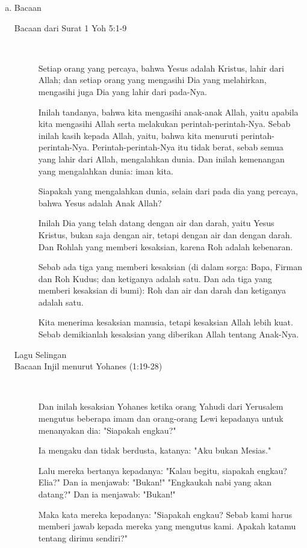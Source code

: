 \documentclass[a5paper,titlepage,12pt]{scrbook}
\begin{document}
\begin{itemize}
\begin{enumerate}[a.]
		\item Bacaan
			\begin{description}
				\item [Bacaan dari Surat 1 Yoh 5:1-9] 
					{~}

Setiap orang yang percaya, bahwa Yesus adalah Kristus, lahir dari Allah; dan setiap orang yang mengasihi Dia yang melahirkan, mengasihi juga Dia yang lahir dari pada-Nya.

Inilah tandanya, bahwa kita mengasihi anak-anak Allah, yaitu apabila kita mengasihi Allah serta melakukan perintah-perintah-Nya.
Sebab inilah kasih kepada Allah, yaitu, bahwa kita menuruti perintah-perintah-Nya. Perintah-perintah-Nya itu tidak berat,
sebab semua yang lahir dari Allah, mengalahkan dunia. Dan inilah kemenangan yang mengalahkan dunia: iman kita.

Siapakah yang mengalahkan dunia, selain dari pada dia yang percaya, bahwa Yesus adalah Anak Allah?

Inilah Dia yang telah datang dengan air dan darah, yaitu Yesus Kristus, bukan saja dengan air, tetapi dengan air dan dengan darah. Dan Rohlah yang memberi kesaksian, karena Roh adalah kebenaran.

Sebab ada tiga yang memberi kesaksian (di dalam sorga: Bapa, Firman dan Roh Kudus; dan ketiganya adalah satu.
Dan ada tiga yang memberi kesaksian di bumi): Roh dan air dan darah dan ketiganya adalah satu.

Kita menerima kesaksian manusia, tetapi kesaksian Allah lebih kuat. Sebab demikianlah kesaksian yang diberikan Allah tentang Anak-Nya.

				\item [Lagu Selingan]

				\item [Bacaan Injil menurut Yohanes (1:19-28)]
				{~}
				
Dan inilah kesaksian Yohanes ketika orang Yahudi dari Yerusalem mengutus beberapa imam dan orang-orang Lewi kepadanya untuk menanyakan dia: "Siapakah engkau?"

Ia mengaku dan tidak berdusta, katanya: "Aku bukan Mesias."

Lalu mereka bertanya kepadanya: "Kalau begitu, siapakah engkau? Elia?" Dan ia menjawab: "Bukan!" "Engkaukah nabi yang akan datang?" Dan ia menjawab: "Bukan!"

Maka kata mereka kepadanya: "Siapakah engkau? Sebab kami harus memberi jawab kepada mereka yang mengutus kami. Apakah katamu tentang dirimu sendiri?"


\end{description}
\end{enumerate}
\end{itemize}
\end{document}

